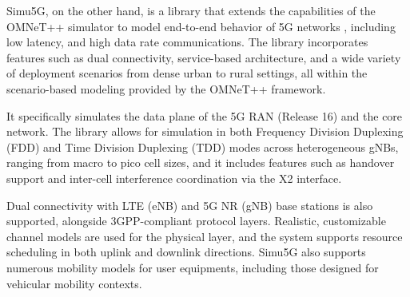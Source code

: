 Simu5G, on the other hand, is a library that extends the capabilities of the OMNeT++ simulator to model end-to-end behavior of 5G networks \cite{9211504}, including low latency, and high data rate communications. The library incorporates features such as dual connectivity, service-based architecture, and a wide variety of deployment scenarios from dense urban to rural settings, all within the scenario-based modeling provided by the OMNeT++ framework.

It specifically simulates the data plane of the 5G RAN (Release 16) and the core network. The library allows for simulation in both Frequency Division Duplexing (FDD) and Time Division Duplexing (TDD) modes across heterogeneous gNBs, ranging from macro to pico cell sizes, and it includes features such as handover support and inter-cell interference coordination via the X2 interface. 

Dual connectivity with LTE (eNB) and 5G NR (gNB) base stations is also supported, alongside 3GPP-compliant protocol layers. Realistic, customizable channel models are used for the physical layer, and the system supports resource scheduling in both uplink and downlink directions. Simu5G also supports numerous mobility models for user equipments, including those designed for vehicular mobility contexts.

